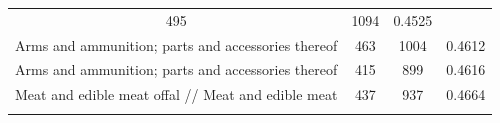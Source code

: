 \documentclass[10pt,]{article}
\begin{document}
\begin{longtable}[]{@{}cccc@{}}
\begin{minipage}[t]{0.21\columnwidth}
495\strut
\end{minipage} & \begin{minipage}[t]{0.20\columnwidth}\centering\strut
1094\strut
\end{minipage} & \begin{minipage}[t]{0.09\columnwidth}\centering\strut
0.4525\strut
\end{minipage}\tabularnewline
\begin{minipage}[t]{0.38\columnwidth}\centering\strut
Arms and ammunition; parts and accessories thereof\strut
\end{minipage} & \begin{minipage}[t]{0.21\columnwidth}\centering\strut
463\strut
\end{minipage} & \begin{minipage}[t]{0.20\columnwidth}\centering\strut
1004\strut
\end{minipage} & \begin{minipage}[t]{0.09\columnwidth}\centering\strut
0.4612\strut
\end{minipage}\tabularnewline
\begin{minipage}[t]{0.38\columnwidth}\centering\strut
Arms and ammunition; parts and accessories thereof\strut
\end{minipage} & \begin{minipage}[t]{0.21\columnwidth}\centering\strut
415\strut
\end{minipage} & \begin{minipage}[t]{0.20\columnwidth}\centering\strut
899\strut
\end{minipage} & \begin{minipage}[t]{0.09\columnwidth}\centering\strut
0.4616\strut
\end{minipage}\tabularnewline
\begin{minipage}[t]{0.38\columnwidth}\centering\strut
Meat and edible meat offal // Meat and edible meat\strut
\end{minipage} & \begin{minipage}[t]{0.21\columnwidth}\centering\strut
437\strut
\end{minipage} & \begin{minipage}[t]{0.20\columnwidth}\centering\strut
937\strut
\end{minipage} & \begin{minipage}[t]{0.09\columnwidth}\centering\strut
0.4664\strut
\end{minipage}\tabularnewline
\begin{minipage}[t]{0.38\columnwidth}\centering\strut

\end{minipage}
\end{longtable}
\end{document}
